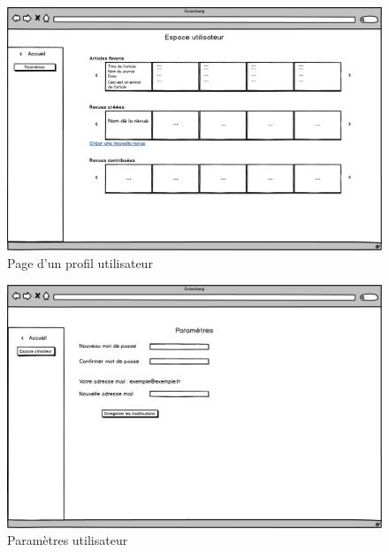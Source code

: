     \begin{figure}[H]
        \centering
        \includegraphics[width=\textwidth]{figures/Utilisateur.png}
            \caption{Page d'un profil utilisateur}
            \label{fig:utilisateur}
    \end{figure}

    \begin{figure}[H]
        \centering
        \includegraphics[width=\textwidth]{figures/Parametre.png}
            \caption{Paramètres utilisateur}
            \label{fig:utilisateur_parametre}
    \end{figure}
